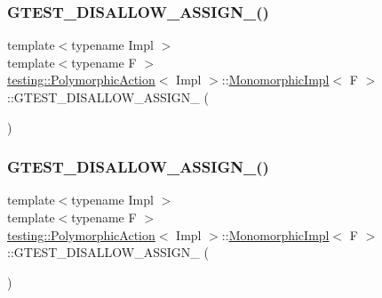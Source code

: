 \subsubsection{\texorpdfstring{GTEST\_DISALLOW\_ASSIGN\_()}{GTEST\_DISALLOW\_ASSIGN\_()}\hspace{0.1cm}{\footnotesize\ttfamily [2/3]}}
{\footnotesize\ttfamily template$<$typename Impl $>$ \\
template$<$typename F $>$ \\
\mbox{\hyperlink{classtesting_1_1_polymorphic_action}{testing\+::\+Polymorphic\+Action}}$<$ Impl $>$\+::\mbox{\hyperlink{classtesting_1_1_polymorphic_action_1_1_monomorphic_impl}{Monomorphic\+Impl}}$<$ F $>$\+::G\+T\+E\+S\+T\+\_\+\+D\+I\+S\+A\+L\+L\+O\+W\+\_\+\+A\+S\+S\+I\+G\+N\+\_\+ (\begin{DoxyParamCaption}\item[{\mbox{\hyperlink{classtesting_1_1_polymorphic_action_1_1_monomorphic_impl}{Monomorphic\+Impl}}$<$ F $>$}]{ }\end{DoxyParamCaption})\hspace{0.3cm}{\ttfamily [private]}}

\mbox{\label{classtesting_1_1_polymorphic_action_1_1_monomorphic_impl_af7b6ce4640aac3dcf7126c4b1e86f277}} 
\subsubsection{\texorpdfstring{GTEST\_DISALLOW\_ASSIGN\_()}{GTEST\_DISALLOW\_ASSIGN\_()}\hspace{0.1cm}{\footnotesize\ttfamily [3/3]}}
{\footnotesize\ttfamily template$<$typename Impl $>$ \\
template$<$typename F $>$ \\
\mbox{\hyperlink{classtesting_1_1_polymorphic_action}{testing\+::\+Polymorphic\+Action}}$<$ Impl $>$\+::\mbox{\hyperlink{classtesting_1_1_polymorphic_action_1_1_monomorphic_impl}{Monomorphic\+Impl}}$<$ F $>$\+::G\+T\+E\+S\+T\+\_\+\+D\+I\+S\+A\+L\+L\+O\+W\+\_\+\+A\+S\+S\+I\+G\+N\+\_\+ (\begin{DoxyParamCaption}\item[{\mbox{\hyperlink{classtesting_1_1_polymorphic_action_1_1_monomorphic_impl}{Monomorphic\+Impl}}$<$ F $>$}]{ }\end{DoxyParamCaption})\hspace{0.3cm}{\ttfamily [private]}}

